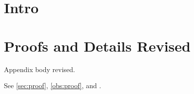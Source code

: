 \section{Intro}
\appendices
\section[Technical Proofs]{Proofs and Details Revised}\label{sec:proof}
\begin{oblemma}\label{obs:proof}
Appendix body revised.
\end{oblemma}
See \autoref{sec:proof}, \cref{obs:proof}, and .
